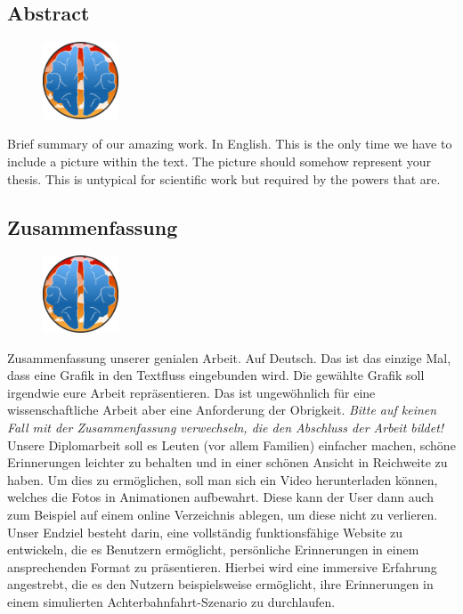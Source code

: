 \begin{spacing}{1}
    \chapter*{Abstract}
\end{spacing}
\begin{figure}
    \begin{center}
      \includegraphics[width=0.2\textwidth]{pics/memoryland-logo.png}
    \end{center}
\end{figure}
Brief summary of our amazing work. In English.
This is the only time we have to include a picture within the text.
The picture should somehow represent your thesis.
This is untypical for scientific work but required by the powers that are.
\lipsum[6]
\newpage
\begin{spacing}{1}
    \chapter*{Zusammenfassung}
\end{spacing}
\begin{figure}
    \begin{center}
      \includegraphics[width=0.2\textwidth]{pics/memoryland-logo.png}
    \end{center}
\end{figure}
Zusammenfassung unserer genialen Arbeit. Auf Deutsch.
Das ist das einzige Mal, dass eine Grafik in den Textfluss eingebunden wird.
Die gewählte Grafik soll irgendwie eure Arbeit repräsentieren.
Das ist ungewöhnlich für eine wissenschaftliche Arbeit aber eine Anforderung der Obrigkeit.
\emph{Bitte auf keinen Fall mit der Zusammenfassung verwechseln, die den Abschluss der Arbeit bildet!}
\lipsum[6]
Unsere Diplomarbeit soll es Leuten (vor allem Familien) einfacher machen, schöne Erinnerungen leichter zu behalten und in einer schönen Ansicht in Reichweite zu haben. Um dies zu ermöglichen, soll man sich ein Video herunterladen können, welches die Fotos in Animationen aufbewahrt. Diese kann der User dann auch zum Beispiel auf einem online Verzeichnis ablegen, um diese nicht zu verlieren.
\\Unser Endziel besteht darin, eine vollständig funktionsfähige Website zu entwickeln, die es Benutzern ermöglicht, persönliche Erinnerungen in einem ansprechenden Format zu präsentieren. Hierbei wird eine immersive Erfahrung angestrebt, die es den Nutzern beispielsweise ermöglicht, ihre Erinnerungen in einem simulierten Achterbahnfahrt-Szenario zu durchlaufen.
  